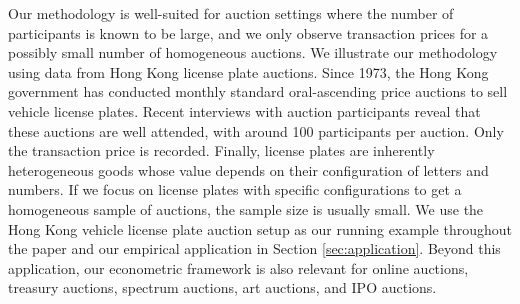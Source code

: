 Our methodology is well-suited for auction settings where the number of participants is known to be large, and we only observe transaction prices for a possibly small number of homogeneous auctions. We illustrate our methodology using data from Hong Kong license plate auctions. Since 1973, the Hong Kong government has conducted monthly standard oral-ascending price auctions to sell vehicle license plates. Recent interviews with auction participants reveal that these auctions are well attended, with around 100 participants per auction. Only the transaction price is recorded.  Finally, license plates are inherently heterogeneous goods whose value depends on their configuration of letters and numbers. If we focus on license plates with specific configurations to get a homogeneous sample of auctions, the sample size is usually small. We use the Hong Kong vehicle license plate auction setup as our running example throughout the paper and our empirical application in Section \ref{sec:application}. Beyond this application, our econometric framework is also relevant for online auctions, treasury auctions, spectrum auctions, art auctions, and IPO auctions.


